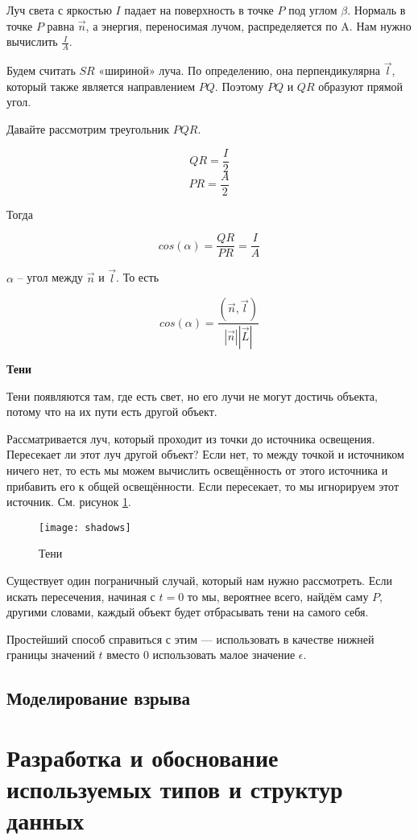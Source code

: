 Луч света с яркостью $I$ падает на поверхность в точке $P$ под углом  $\beta$. Нормаль в точке $P$ равна $\vec n$, а энергия, переносимая лучом, распределяется по A. Нам нужно вычислить $\frac{I}{A}$.

Будем считать $SR$ «шириной» луча. По определению, она перпендикулярна $\vec l$, который также является направлением $PQ$. Поэтому $PQ$ и $QR$ образуют прямой угол. 

Давайте рассмотрим треугольник $PQR$. 

$$QR = \frac{I}{2}$$
$$PR = \frac{A}{2}$$

Тогда

$$cos(\alpha) = \frac{QR}{PR} = \frac{I}{A}$$
 
$\alpha$ -- угол между $\vec n$ и $\vec l$. То есть

$$cos(\alpha) = \frac{(\vec n, \vec l)}{|\vec n||\vec L|}$$

\textbf{Тени}

Тени появляются там, где есть свет, но его лучи не могут достичь объекта, потому что на их пути есть другой объект.

Рассматривается луч, который проходит из точки до источника освещения. Пересекает ли этот луч другой объект? Если нет, то между точкой и источником ничего нет, то есть мы можем вычислить освещённость от этого источника и прибавить его к общей освещённости. Если пересекает, то мы игнорируем этот источник. См. рисунок \ref{img:shadows}. 

\begin{figure}[H]
	\centering
	\texttt{[image: shadows]}
	\caption{Тени}
	\label{img:shadows}
\end{figure}

Существует один пограничный случай, который нам нужно рассмотреть. Если искать пересечения, начиная с $t=0$ то мы, вероятнее всего, найдём саму $P$, другими словами, каждый объект будет отбрасывать тени на самого себя. 

Простейший способ справиться с этим — использовать в качестве нижней границы значений $t$ вместо 0 использовать малое значение $\epsilon$. 


\subsection{\textbf{Моделирование взрыва}}

\hfill

\section{\textbf{Разработка и обоснование используемых типов и структур данных }}

